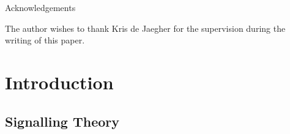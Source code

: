 \documentclass[a4paper,10pt]{article}
\numberwithin{equation}{section}
\begin{document}
\vspace{.4cm}

\begin{center}
\begin{minipage}[t]{0.7\textwidth}
\begin{bf}
Acknowledgements
\end{bf}
\newline
\newline
The author wishes to thank Kris de Jaegher for the supervision during the writing of this paper.
\end{minipage}
\end{center}

\vspace{.6cm}

\newpage

\label{sec:Contents}
\renewcommand{\contentsname}{Contents\\} 
\tableofcontents

\newpage

\section{Introduction}
\label{sec:Introduction}
\subsection{Signalling Theory}
\label{sec:Signalling Theory}
\end{document}
